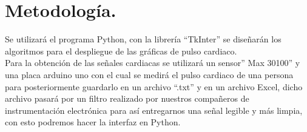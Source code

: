 \documentclass[14pt]{report}
\begin{document}
	\section{Metodología.}
	Se utilizará el programa Python, con la librería “TkInter” se diseñarán los algoritmos para el despliegue de las gráficas de pulso cardiaco. \\
	Para la obtención de las señales cardiacas se utilizará un sensor” Max 30100” y una placa arduino uno con el cual se medirá el pulso cardiaco de una persona para posteriormente guardarlo en un archivo “.txt” y en un archivo Excel, dicho archivo pasará por un filtro realizado por nuestros compañeros de instrumentación electrónica para así entregarnos una señal legible y más limpia, con esto podremos hacer la interfaz en Python.
	\printbibliography
\end{document}
